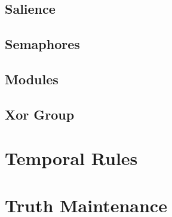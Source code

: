 \subsection{Salience}
\subsection{Semaphores}
\subsection{Modules}
\subsection{Xor Group}

\section{Temporal Rules}

\section{Truth Maintenance}
                                                                                     
